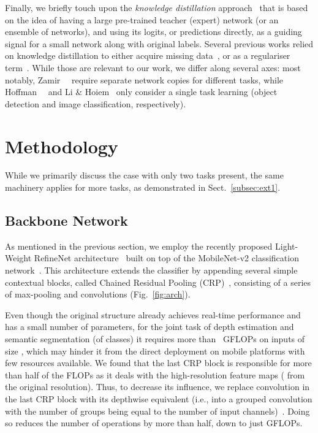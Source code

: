 \documentclass[letterpaper, 10 pt, conference]{ieeeconf}
\begin{document}
Finally, we briefly touch upon the {\em knowledge distillation} approach~\cite{BucilaCN06,HintonVD15,BaC14,RomeroBKCGB14} that is based on the idea of having a large pre-trained teacher (expert) network (or an ensemble of networks), and using its logits, or predictions directly, as a guiding signal for a small network along with original labels. Several previous works relied on knowledge distillation to either acquire missing data~\cite{zamir2018taskonomy}, or as a regulariser term~\cite{hoffman2016learning,li2017learning}. While those are relevant to our work, we differ along several axes: most notably, Zamir~\etal~\cite{zamir2018taskonomy} require separate network copies for different tasks, while Hoffman~\etal~\cite{hoffman2016learning} and Li \& Hoiem~\cite{li2017learning} only consider a single task learning (object detection and image classification, respectively).


\section{Methodology}
While we primarily discuss the case with only two tasks present, the same machinery applies for more tasks, as demonstrated in Sect.~\ref{subsec:ext1}.
\label{sec:method}

\subsection{Backbone Network}
As mentioned in the previous section, we employ the recently proposed Light-Weight RefineNet architecture~\cite{nekrasovlight} built on top of the MobileNet-v2 classification network~\cite{abs-1801-04381}. This architecture extends the classifier by appending several simple contextual blocks, called Chained Residual Pooling (CRP)~\cite{LinMSR17}, consisting of a series of  max-pooling and  convolutions (Fig.~\ref{fig:arch}).

Even though the original structure already achieves real-time performance and has a small number of parameters, for the joint task of depth estimation and semantic segmentation (of  classes) it requires more than ~GFLOPs on inputs of size , which may hinder it from the direct deployment on mobile platforms with few resources available. We found that the last CRP block is responsible for more than half of the FLOPs as it deals with the high-resolution feature maps ( from the original resolution). Thus, to decrease its influence, we replace  convolution in the last CRP block with its depthwise equivalent (i.e., into a grouped convolution with the number of groups being equal to the number of input channels)~\cite{Chollet17}. Doing so reduces the number of operations by more than half, down to just  GFLOPs.
\end{document}
